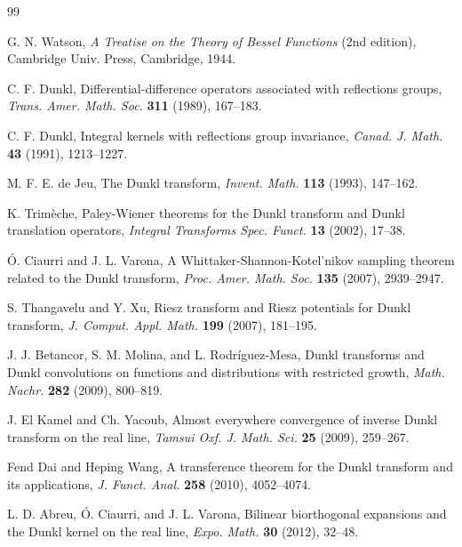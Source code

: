 \documentclass[a4paper]{amsart}
\numberwithin{equation}{section}
\theoremstyle{plain}
\theoremstyle{remark}
\begin{document}
\begin{thebibliography}{99}


 G. N. Watson,
\textit{A Treatise on the Theory of Bessel Functions} (2nd edition),
Cambridge Univ. Press,
Cambridge, 1944.

 C. F. Dunkl,
{Differential-difference operators associated with reflections groups},
\textit{Trans. Amer. Math. Soc.}
\textbf{311} (1989), 167--183.

 C. F. Dunkl, 
{Integral kernels with reflections group invariance}, 
\textit{Canad. J. Math.} 
\textbf{43} (1991), 1213--1227.

 M. F. E. de Jeu,
{The Dunkl transform},
\textit{Invent. Math.}
\textbf{113} (1993), 147--162.

 K. Trim\`eche,
{Paley-Wiener theorems for the Dunkl transform and Dunkl translation operators},
\textit{Integral Transforms Spec. Funct.}
\textbf{13} (2002), 17--38.

 \'O. Ciaurri and J. L. Varona,
{A Whittaker-Shannon-Kotel'nikov sampling theorem related to the Dunkl transform},
\textit{Proc. Amer. Math. Soc.}
\textbf{135} (2007), 2939--2947.

 S. Thangavelu and Y. Xu, 
{Riesz transform and Riesz potentials for Dunkl transform}, 
\textit{J. Comput. Appl. Math.} 
\textbf{199} (2007), 181--195.

 J. J. Betancor, S. M. Molina, and L. Rodr\'iguez-Mesa,
{Dunkl transforms and Dunkl convolutions on functions and distributions with restricted growth},
\textit{Math. Nachr.} 
\textbf{282} (2009), 800--819. 

 J. El Kamel and Ch. Yacoub, 
{Almost everywhere convergence of inverse Dunkl transform on the real line}, 
\textit{Tamsui Oxf. J. Math. Sci.} 
\textbf{25} (2009), 259--267.

 Fend Dai and Heping Wang, 
A transference theorem for the Dunkl transform and its applications, 
\textit{J. Funct. Anal.} 
\textbf{258} (2010), 4052--4074.

 L. D. Abreu, \'O. Ciaurri, and J. L. Varona, 
{Bilinear biorthogonal expansions and the Dunkl kernel on the real line}, 
\textit{Expo. Math.} 
\textbf{30} (2012), 32--48.


\end{thebibliography}
\end{document}

